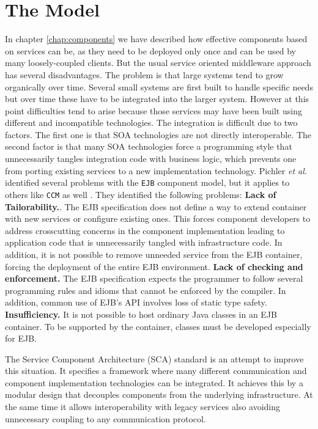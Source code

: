 \section{The Model}
In chapter \ref{chap:components} we have described how effective components based on services can be, as they need to be deployed only
once and can be used by many loosely-coupled clients. But the usual service oriented middleware approach has several disadvantages.
The problem is that large systems tend to grow organically over time. Several small systems are first built to handle specific needs
but over time these have to be integrated into the larger system. However at this point difficulties tend to arise because
those services may have been built using different and incompatible technologies. The integration is difficult due to two
factors. The first one is that SOA technologies are not directly interoperable. The second factor is that many SOA technologies
force a programming style that unnecessarily tangles integration code with business logic, which prevents one from porting
existing services to a new implementation technology. Pichler \emph{et al.} identified several problems with the \texttt{EJB}
component model, but it applies to others like \texttt{CCM} as well \cite{Pichler}. They identified the following problems:
\textbf{Lack of Tailorability.}. The EJB specification does not define a way to extend container with new services or configure
existing ones. This forces component developers to address crosscutting concerns in the component implementation leading to application
code that is unnecessarily tangled with infrastructure code. In addition, it is not possible to remove unneeded service from
the EJB container, forcing the deployment of the entire EJB environment. \textbf{Lack of checking and enforcement.} The EJB
specification expects the programmer to follow several programming rules and idioms that cannot be enforced by the compiler.
In addition, common use of EJB's API involves loss of static type safety. \textbf{Insufficiency.} It is not possible to host
ordinary Java classes in an EJB container. To be supported by the container, classes must be developed especially for EJB.

The Service Component Architecture (SCA) standard is an attempt to improve this situation. It specifies a framework
where many different communication and component implementation technologies can be integrated. It achieves this
by a modular design that decouples components from the underlying infrastructure. At the same time it allows
interoperability with legacy services also avoiding unnecessary coupling to any communication protocol.

